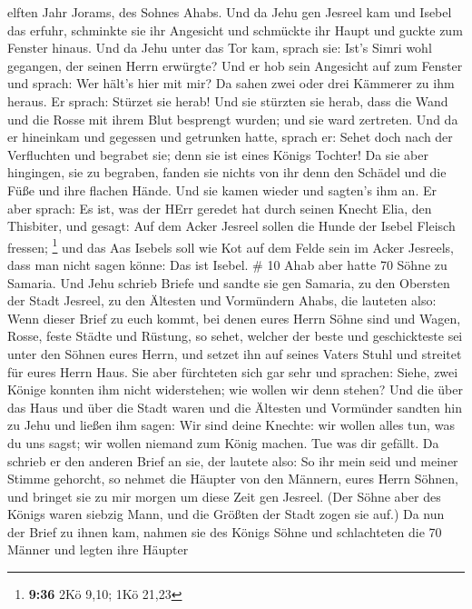 elften Jahr Jorams, des Sohnes Ahabs.  Und da Jehu gen
Jesreel kam und Isebel das erfuhr, schminkte sie ihr Angesicht und
schmückte ihr Haupt und guckte zum Fenster hinaus.  Und da
Jehu unter das Tor kam, sprach sie: Ist's Simri wohl gegangen, der
seinen Herrn erwürgte?  Und er hob sein Angesicht auf zum
Fenster und sprach: Wer hält's hier mit mir? Da sahen zwei oder drei
Kämmerer zu ihm heraus.  Er sprach: Stürzet sie herab! Und
sie stürzten sie herab, dass die Wand und die Rosse mit ihrem Blut
besprengt wurden; und sie ward zertreten.  Und da er
hineinkam und gegessen und getrunken hatte, sprach er: Sehet doch nach
der Verfluchten und begrabet sie; denn sie ist eines Königs Tochter!
 Da sie aber hingingen, sie zu begraben, fanden sie nichts
von ihr denn den Schädel und die Füße und ihre flachen Hände.
 Und sie kamen wieder und sagten's ihm an. Er aber sprach:
Es ist, was der HErr geredet hat durch seinen Knecht Elia, den
Thisbiter, und gesagt: Auf dem Acker Jesreel sollen die Hunde der Isebel
Fleisch fressen; \footnote{\textbf{9:36} 2Kö 9,10; 1Kö 21,23}
 und das Aas Isebels soll wie Kot auf dem Felde sein im
Acker Jesreels, dass man nicht sagen könne: Das ist Isebel. \# 10
 Ahab aber hatte 70 Söhne zu Samaria. Und Jehu schrieb
Briefe und sandte sie gen Samaria, zu den Obersten der Stadt Jesreel, zu
den Ältesten und Vormündern Ahabs, die lauteten also:  Wenn
dieser Brief zu euch kommt, bei denen eures Herrn Söhne sind und Wagen,
Rosse, feste Städte und Rüstung,  so sehet, welcher der
beste und geschickteste sei unter den Söhnen eures Herrn, und setzet ihn
auf seines Vaters Stuhl und streitet für eures Herrn Haus. 
Sie aber fürchteten sich gar sehr und sprachen: Siehe, zwei Könige
konnten ihm nicht widerstehen; wie wollen wir denn stehen? 
Und die über das Haus und über die Stadt waren und die Ältesten und
Vormünder sandten hin zu Jehu und ließen ihm sagen: Wir sind deine
Knechte: wir wollen alles tun, was du uns sagst; wir wollen niemand zum
König machen. Tue was dir gefällt.  Da schrieb er den
anderen Brief an sie, der lautete also: So ihr mein seid und meiner
Stimme gehorcht, so nehmet die Häupter von den Männern, eures Herrn
Söhnen, und bringet sie zu mir morgen um diese Zeit gen Jesreel. (Der
Söhne aber des Königs waren siebzig Mann, und die Größten der Stadt
zogen sie auf.)  Da nun der Brief zu ihnen kam, nahmen sie
des Königs Söhne und schlachteten die 70 Männer und legten ihre Häupter
